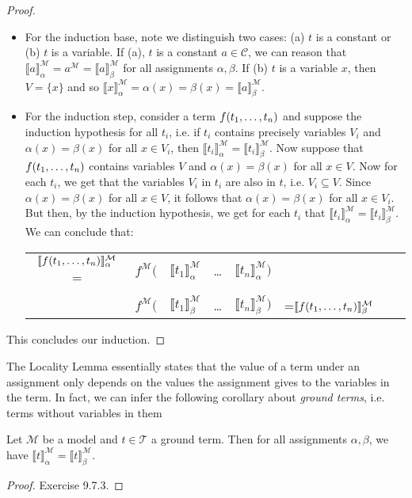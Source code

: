 \begin{enumerate}[\thesection.1]
\begin{proof}
		\begin{itemize}
		
		\item For the induction base, note we distinguish two cases: (a) $t$ is a constant or (b) $t$ is a variable. If (a), $t$ is a constant $a\in\mathcal{C}$, we can reason that $\llbracket a\rrbracket^\mathcal{M}_\alpha=a^\mathcal{M}=\llbracket a\rrbracket^\mathcal{M}_\beta$ for all assignments $\alpha,\beta$. If (b) $t$ is a variable $x$, then $V=\{x\}$ and so $\llbracket x\rrbracket^\mathcal{M}_\alpha=\alpha(x)=\beta(x)=\llbracket a\rrbracket^\mathcal{M}_\beta$. 
		
		\item For the induction step, consider a term $f(t_1, \mathellipsis, t_n)$ and suppose the induction hypothesis for all $t_i$, i.e. if $t_i$ contains precisely variables $V_i$ and $\alpha(x)=\beta(x)$ for all $x\in V_i$, then $\llbracket t_i\rrbracket_\alpha^\mathcal{M}=\llbracket t_i\rrbracket_\beta^\mathcal{M}$. Now suppose that $f(t_1, \mathellipsis, t_n)$ contains variables $V$ and $\alpha(x)=\beta(x)$ for all $x\in V$. Now for each $t_i$, we get that the variables $V_i$ in $t_i$ are also in $t$, i.e. $V_i\subseteq V$. Since $\alpha(x)=\beta(x)$ for all $x\in V$, it follows that $\alpha(x)=\beta(x)$ for all $x\in V_i$. But then, by the induction hypothesis, we get for each $t_i$ that $\llbracket t_i\rrbracket_\alpha^\mathcal{M}=\llbracket t_i\rrbracket_\beta^\mathcal{M}$. We can conclude that:
	\begin{center}
		\begin{tabular}{c c c c c c ll}
		$\llbracket f(t_1, \mathellipsis, t_n)\rrbracket^\mathcal{M}_\alpha$ = & $f^\mathcal{M}($ & $\llbracket t_1\rrbracket^\mathcal{M}_\alpha$ &  \dots & $\llbracket t_n\rrbracket^\mathcal{M}_\alpha)$\\
		 & & \rotatebox{90}{=} & & \rotatebox{90}{=} &\\
		& $f^\mathcal{M}($ & $\llbracket t_1\rrbracket^\mathcal{M}_\beta$ &  \dots & $\llbracket t_n\rrbracket^\mathcal{M}_\beta)$&=$\llbracket f(t_1, \mathellipsis, t_n)\rrbracket^\mathcal{M}_\beta$ \\
		\end{tabular}
		\end{center}
		
	\end{itemize}
This concludes our induction.				
		
	\end{proof}
	The Locality Lemma essentially states that the value of a term under an assignment only depends on the values the assignment gives to the variables in the term. In fact, we can infer the following corollary about \emph{ground terms}, i.e. terms without variables in them
		\begin{corollary}
		Let $\mathcal{M}$ be a model and $t\in\mathcal{T}$ a ground term. Then for all assignments $\alpha,\beta$, we have $\llbracket t\rrbracket_\alpha^\mathcal{M}=\llbracket t\rrbracket_\beta^\mathcal{M}$.
		\end{corollary}
		\begin{proof}
		Exercise 9.7.3.
		\end{proof}
	

\end{enumerate}
